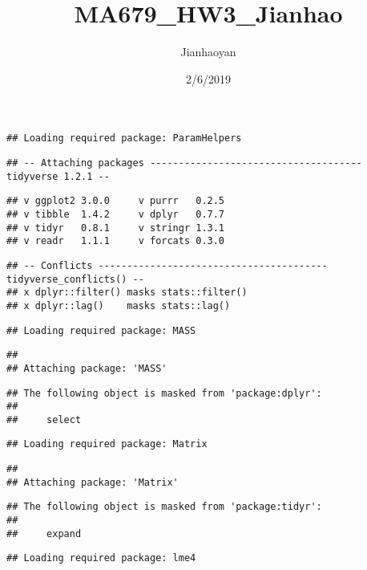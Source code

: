 \documentclass[]{article}
\title{MA679\_HW3\_Jianhao}
\author{Jianhaoyan}
\date{2/6/2019}
\begin{document}
\maketitle

\begin{verbatim}
## Loading required package: ParamHelpers
\end{verbatim}

\begin{verbatim}
## -- Attaching packages ------------------------------------- tidyverse 1.2.1 --
\end{verbatim}

\begin{verbatim}
## v ggplot2 3.0.0     v purrr   0.2.5
## v tibble  1.4.2     v dplyr   0.7.7
## v tidyr   0.8.1     v stringr 1.3.1
## v readr   1.1.1     v forcats 0.3.0
\end{verbatim}

\begin{verbatim}
## -- Conflicts ---------------------------------------- tidyverse_conflicts() --
## x dplyr::filter() masks stats::filter()
## x dplyr::lag()    masks stats::lag()
\end{verbatim}

\begin{verbatim}
## Loading required package: MASS
\end{verbatim}

\begin{verbatim}
## 
## Attaching package: 'MASS'
\end{verbatim}

\begin{verbatim}
## The following object is masked from 'package:dplyr':
## 
##     select
\end{verbatim}

\begin{verbatim}
## Loading required package: Matrix
\end{verbatim}

\begin{verbatim}
## 
## Attaching package: 'Matrix'
\end{verbatim}

\begin{verbatim}
## The following object is masked from 'package:tidyr':
## 
##     expand
\end{verbatim}

\begin{verbatim}
## Loading required package: lme4
\end{verbatim}
\end{document}
